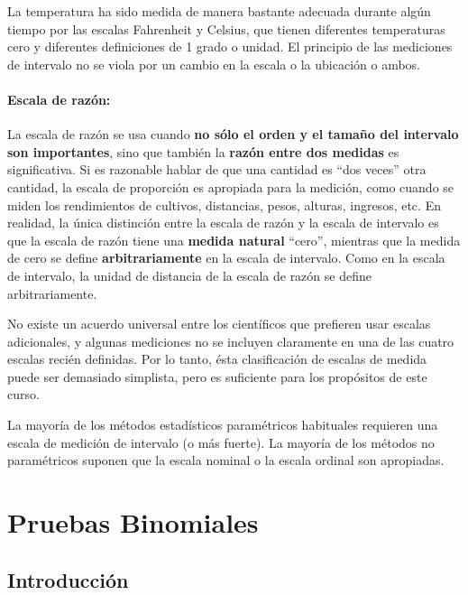 \documentclass[
  a4paper,
  oneside,
  openany]{book}
\begin{document}
La temperatura ha sido medida de manera bastante adecuada durante algún tiempo por las escalas Fahrenheit y Celsius, que tienen diferentes temperaturas cero y diferentes definiciones de 1 grado o unidad. El principio de las mediciones de intervalo no se viola por un cambio en la escala o la ubicación o ambos.

\hypertarget{escala-de-razuxf3n}{%
\subsection{Escala de razón:}\label{escala-de-razuxf3n}}

La escala de razón se usa cuando \textbf{no sólo el orden y el tamaño del intervalo son importantes}, sino que también la \textbf{razón entre dos medidas} es significativa. Si es razonable hablar de que una cantidad es ``dos veces'' otra cantidad, la escala de proporción es apropiada para la medición, como cuando se miden los rendimientos de cultivos, distancias, pesos, alturas, ingresos, etc. En realidad, la única distinción entre la escala de razón y la escala de intervalo es que la escala de razón tiene una \textbf{medida natural} ``cero'', mientras que la medida de cero se define \textbf{arbitrariamente} en la escala de intervalo. Como en la escala de intervalo, la unidad de distancia de la escala de razón se define arbitrariamente.

No existe un acuerdo universal entre los científicos que prefieren usar escalas adicionales, y algunas mediciones no se incluyen claramente en una de las cuatro escalas recién definidas.
Por lo tanto, ésta clasificación de escalas de medida puede ser demasiado simplista, pero es suficiente para los propósitos de este curso.

La mayoría de los métodos estadísticos paramétricos habituales requieren una escala de medición de intervalo (o más fuerte). La mayoría de los métodos no paramétricos suponen que la escala nominal o la escala ordinal son apropiadas.

\hypertarget{part-pruebas-binomiales}{%
\part{Pruebas Binomiales}\label{part-pruebas-binomiales}}

\hypertarget{introducciuxf3n}{%
\chapter*{Introducción}\label{introducciuxf3n}}
\end{document}
